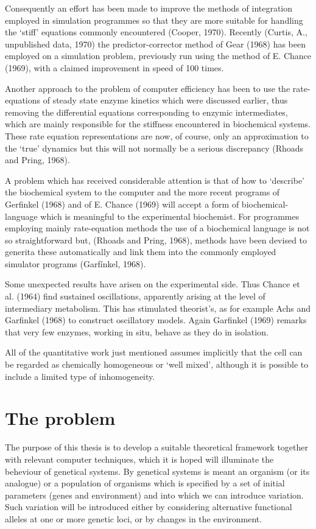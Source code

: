 Consequently an effort has been made to improve the methods of integration employed in simulation programmes so that they are more suitable for handling the `stiff' equations commonly encountered (Cooper, 1970). Recently (Curtis, A., unpublished data, 1970) the predictor-corrector method of Gear (1968) has been employed on a simulation problem, previously run using the method of E. Chance (1969), with a claimed improvement in speed of 100 times.

Another approach to the problem of computer efficiency has been to use the rate-equations of steady state enzyme kinetics which were discussed earlier, thus removing the differential equations corresponding to enzymic intermediates, which are mainly responsible for the stiffness encountered in biochemical systems. These rate equation representations are now, of course, only an approximation to the `true' dynamics but this will not normally be a serious discrepancy (Rhoads and Pring, 1968).

A problem which has received considerable attention is that of how to `describe' the biochemical system to the computer and the more recent programs of Gerfinkel (1968) and of E. Chance (1969) will accept a form of biochemical-language which is meaningful to the experimental biochemist. For programmes employing mainly rate-equation methods the use of a biochemical language is not so straightforward but, (Rhoads and Pring, 1968), methods have been devised to generita these automatically and link them into the commonly employed simulator programs (Garfínkel, 1968).

Some unexpected results have arisen on the experimental side. Thus Chance et al. (1964) find sustained oscillations, apparently arising at the level of intermediary metabolism. This has stimulated theorist's, as for example Achs and Garfinkel (1968) to construct oscillatory models. Again Garfinkel (1969) remarks that very few enzymes, working in situ, behave as they do in isolation.

All of the quantitative work just mentioned assumes implicitly that the cell can be regarded as chemically homogeneous or `well mixed', although it is possible to include a limited type of inhomogeneity.

\section{The problem}

The purpose of this thesis is to develop a suitable theoretical framework together with relevant computer techniques, which it is hoped will illuminate the beheviour of genetical systems. By genetical systems is meant an organism (or its analogue) or a population of organisms which is specified by a set of initial parameters (genes and environment) and into which we can introduce variation. Such variation will be introduced either by considering alternative functional alleles at one or more genetic loci, or by changes in the environment.

